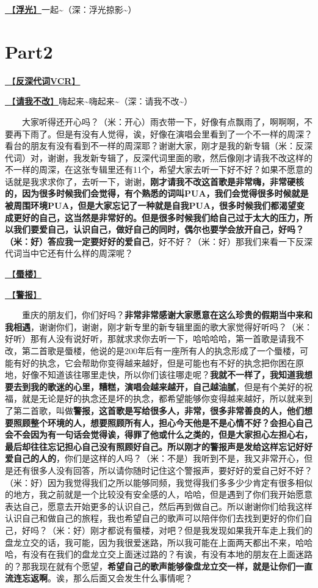 \documentclass[]{ctexbook}
\begin{document}
\hyperref[floating-light]{🎵【\textbf{浮光}】}一起\textasciitilde（深：浮光掠影\textasciitilde）

\section{Part2}\label{chongqing-20241006-part2}

\hyperref[senself-vcr]{🎥【\textbf{反深代词VCR}】}

\hyperref[brave-heart]{🎵【\textbf{请我不改}】}嗨起来\textasciitilde 嗨起来\textasciitilde（深：请我不改\textasciitilde）

  大家听得还开心吗？（米：开心）雨衣带一下，好像有点飘雨了，啊啊啊，不要再下雨了。但是有没有人觉得，诶，好像在演唱会里看到了一个不一样的周深？看台的朋友有没有看到不一样的周深耶？谢谢大家，刚才是我的新专辑（米：反深代词）对，谢谢，我发新专辑了，反深代词里面的歌，然后像刚才请我不改这样的不一样的周深，在这张专辑里还有11个，希望大家去听一下好不好？如果不愿意的话就是我求求你了，去听一下，谢谢，\textbf{刚才请我不改这首歌是非常嗨，非常硬核的，因为很多时候我们会觉得，有个熟悉的词叫PUA，我们会觉得很多时候就是被周围环境PUA，但是大家忘记了一种就是自我PUA，很多时候我们都渴望变成更好的自己，这当然是非常好的。但是很多时候我们给自己过于太大的压力，所以我们要爱自己，认识自己，做好自己的同时，偶尔也要学会放开自己，好吗？（米：好）答应我一定要好好的爱自己}，好不好？（米：好）那我们来看一下反深代词当中它还有什么样的周深呢？

\hyperref[mirage]{🎵【\textbf{蜃楼}】}

\hyperref[the-giver]{🎵【\textbf{警报}】}

  重庆的朋友们，你们好吗？\textbf{非常非常感谢大家愿意在这么珍贵的假期当中来和我相遇}，谢谢你们，谢谢，刚才新专里的新专辑里面的歌大家觉得好听吗？（米：好听）那有人没有说好听，那就求求你去听一下，哈哈哈哈，第一首歌是请我不改，第二首歌是蜃楼，他说的是200年后有一座所有人的执念形成了一个蜃楼，可能有好的执念，它会帮助你变得越来越好，但是可能也有不好的执念把你困在原地，好像不知道该往哪里走快，所以你们该往哪走呢？\textbf{我就不一样了，我知道我想要去到我的歌迷的心里，糟糕，演唱会越来越开，自己越油腻}，但是有个美好的祝福，就是无论是好的执念还是坏的执念，都希望能够你变得越来越好，所以就来到了第二首歌，叫做\textbf{警报，这首歌是写给很多人，非常，很多非常善良的人，他们想要照顾整个环境的人，想要照顾所有人，担心今天他是不是心情不好？会担心自己会不会因为有一句话会觉得诶，得罪了他或什么之类的，但是大家担心左担心右，最后却往往忘记担心自己没有照顾好自己。所以刚才的警报声是发给这样忘记好好爱自己的人的}，你们是这样的人吗？（米：不是）我听到不是，我又非常开心，但是还有很多人没有回答，所以请你随时记住这个警报声，要好好的爱自己好不好？（米：好）因为我觉得我们之所以能够同频，我觉得我们多多少少肯定有很多相似的地方，我之前就是一个比较没有安全感的人，哈哈，但是遇到了你们我开始愿意表达自己，愿意去开始更多的认识自己，然后再到做自己。所以谢谢你们给我这样认识自己和做自己的旅程，我也希望自己的歌声可以陪伴你们去找到更好的你们自己，好吗？（米：好）刚才都说有蜃楼，对吧？但是我发现如果我开车走上我们的盘龙立交的话，我可能，因为我很爱迷路，所以我可能在上面两天都出不来，哈哈哈，有没有在我们的盘龙立交上面迷过路的？有诶，有没有本地的朋友在上面迷路的？那我现在就有个愿望，\textbf{希望自己的歌声能够像盘龙立交一样，就是让你们一直流连忘返啊}。诶，那么后面又会发生什么事情呢？
\end{document}
